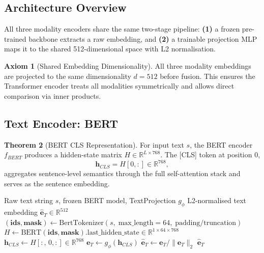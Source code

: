 \documentclass[12pt,a4paper]{article}
\theoremstyle{definition}
\newtheorem{theorem}{Theorem}[section]
\newtheorem{axiom}[theorem]{Axiom}
\begin{document}
\subsection{Architecture Overview}

All three modality encoders share the same two-stage pipeline: \textbf{(1)} a frozen pre-trained backbone extracts a raw embedding, and \textbf{(2)} a trainable projection MLP maps it to the shared 512-dimensional space with L2 normalisation.

\begin{axiom}[Shared Embedding Dimensionality]
All three modality embeddings are projected to the same dimensionality $d = 512$ before fusion. This ensures the Transformer encoder treats all modalities symmetrically and allows direct comparison via inner products.
\end{axiom}

\subsection{Text Encoder: BERT}

\begin{theorem}[BERT CLS Representation]
For input text $s$, the BERT encoder $f_{BERT}$ produces a hidden-state matrix $H \in \mathbb{R}^{L \times 768}$. The [CLS] token at position 0,
$$\mathbf{h}_{CLS} = H[0, :] \in \mathbb{R}^{768},$$
aggregates sentence-level semantics through the full self-attention stack and serves as the sentence embedding.
\end{theorem}

\begin{algorithm}[H]
\caption{\textsc{EncodeText} — BERT CLS Embedding}
\label{alg:enc_text}
\begin{algorithmic}[1]
\Require Raw text string $s$, frozen BERT model, TextProjection $g_\phi$
\Ensure L2-normalised text embedding $\hat{\mathbf{e}}_T \in \mathbb{R}^{512}$
\State $(\mathbf{ids}, \mathbf{mask}) \gets \text{BertTokenizer}(s,\; \text{max\_length}=64,\; \text{padding/truncation})$
\State $H \gets \text{BERT}(\mathbf{ids}, \mathbf{mask}).\text{last\_hidden\_state} \in \mathbb{R}^{1 \times 64 \times 768}$
\State $\mathbf{h}_{CLS} \gets H[:,\,0,:] \in \mathbb{R}^{768}$ 
\State $\mathbf{e}_T \gets g_\phi(\mathbf{h}_{CLS})$ 
\State $\hat{\mathbf{e}}_T \gets \mathbf{e}_T / \|\mathbf{e}_T\|_2$ 
\State \Return $\hat{\mathbf{e}}_T$
\end{algorithmic}
\end{algorithm}
\end{document}
